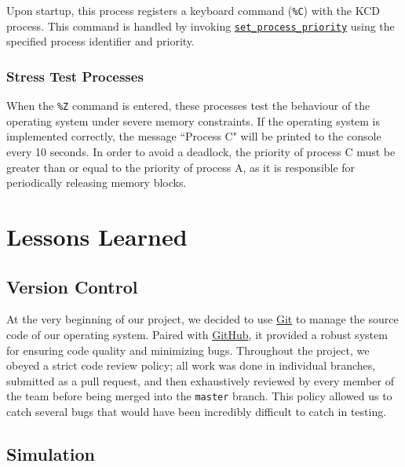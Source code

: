 \documentclass[12pt]{report}
\begin{document}
Upon startup, this process registers a keyboard command (\texttt{\%C}) with the KCD process. This command is handled by invoking \hyperref[alg:processpriority]{\texttt{set_process_priority}} using the specified process identifier and priority.

\subsection{Stress Test Processes}

When the \texttt{\%Z} command is entered, these processes test the behaviour of the operating system under severe memory constraints. If the operating system is implemented correctly, the message ``Process C" will be printed to the console every 10 seconds. In order to avoid a deadlock, the priority of process C must be greater than or equal to the priority of process A, as it is responsible for periodically releasing memory blocks.

\chapter{Lessons Learned}

\section{Version Control}

At the very beginning of our project, we decided to use \href{http://git-scm.com/}{Git} to manage the source code of our operating system. Paired with \href{http://github.com/}{GitHub}, it provided a robust system for ensuring code quality and minimizing bugs. Throughout the project, we obeyed a strict code review policy; all work was done in individual branches, submitted as a pull request, and then exhaustively reviewed by every member of the team before being merged into the \texttt{master} branch. This policy allowed us to catch several bugs that would have been incredibly difficult to catch in testing.

\section{Simulation}
\end{document}
